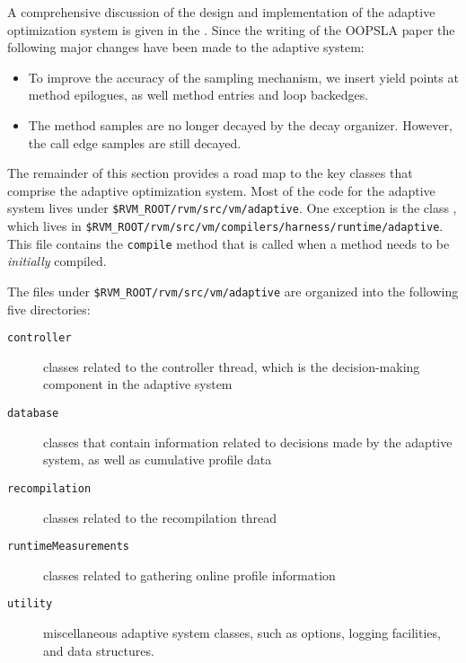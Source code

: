 A comprehensive discussion of the design and implementation of the
adaptive optimization system is given in the
.  
Since the writing of the OOPSLA paper the following major changes
have been made to the adaptive system:
\begin{itemize}
\item To improve the accuracy of the sampling mechanism, we insert
yield points at method epilogues, as well method entries and loop
backedges. 

\item The method samples are no longer decayed by the decay
organizer.  However, the call edge samples are still decayed.

\end{itemize}

The remainder of this section provides a road map to the key
classes that comprise the adaptive optimization system.
Most of the code for the adaptive system lives under
{\tt \$RVM\_\-ROOT/rvm/src/vm/adaptive}.   One exception is the class
, which lives in
{\tt \$RVM\_\-ROOT/\-rvm/\-src/\-vm/\-compilers/harness/runtime/adaptive}.  
This file contains the {\tt compile} method that is called when a
method needs to be {\em initially\/} compiled.  

The files under {\tt \$RVM\_\-ROOT/rvm/src/vm/adaptive} are organized
into the following five directories:
\begin{description}
\item[\texttt{controller}] classes related to the controller thread, which is
the decision-making component in the adaptive system

\item[\texttt{database}] classes that contain information related to decisions
made by the adaptive system, as well as cumulative profile data

\item[\texttt{recompilation}]  classes related to the recompilation thread

\item[\texttt{runtimeMeasurements}] classes related to gathering online
profile information

\item[\texttt{utility}]  miscellaneous adaptive system classes, such as
options, logging facilities, and data structures.
\end{description}

